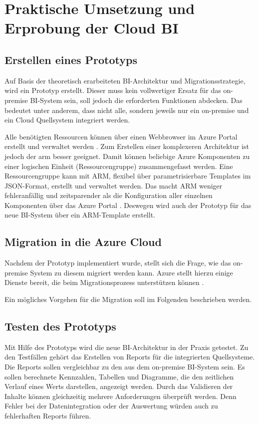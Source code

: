 \chapter{Praktische Umsetzung und Erprobung der Cloud BI} \label{ch:praktischeUmsetzung}

\section{Erstellen eines Prototyps} \label{sec:intro:erstellenDesPrototyps}
Auf Basis der theoretisch erarbeiteten BI-Architektur und Migrationsstrategie, wird ein Prototyp erstellt. Dieser muss kein vollwertiger Ersatz für das on-premise BI-System sein, soll jedoch die erforderten Funktionen abdecken. Das bedeutet unter anderem, dass nicht alle, sondern jeweils nur ein on-premise und ein Cloud Quellsystem integriert werden.

Alle benötigten Ressourcen können über einen Webbrowser im Azure Portal erstellt und verwaltet werden \cite{chilberto_building_2020}. Zum Erstellen einer komplexeren Architektur ist jedoch der \ac{arm} besser geeignet. Damit können beliebige Azure Komponenten zu einer logischen Einheit (Ressourcengruppe) zusammengefasst werden. Eine Ressourcengruppe kann mit ARM, flexibel über parametrisierbare Templates im JSON-Format, erstellt und verwaltet werden. Das macht ARM weniger fehleranfällig und zeitsparender als die Konfiguration aller einzelnen Komponenten über das Azure Portal \cite{monadjemi_azure-administration_2017}. Deswegen wird auch der Prototyp für das neue BI-System über ein ARM-Template erstellt.

\section{Migration in die Azure Cloud} \label{sec:praktischeUmsetzung:Migration}
Nachdem der Prototyp implementiert wurde, stellt sich die Frage, wie das on-premise System zu diesem migriert werden kann. Azure stellt hierzu einige Dienste bereit, die beim Migrationsprozess unterstützen können \cite{chilberto_building_2020}. 

Ein mögliches Vorgehen für die Migration soll im Folgenden beschrieben werden.

\section{Testen des Prototyps} \label{sec:intro:testenDesPrototyps}
Mit Hilfe des Prototyps wird die neue BI-Architektur in der Praxis getestet. Zu den Testfällen gehört das Erstellen von Reports für die integrierten Quellsysteme. Die Reports sollen vergleichbar zu den aus dem on-premise BI-System sein. Es sollen berechnete Kennzahlen, Tabellen und Diagramme, die den zeitlichen Verlauf eines Werts darstellen, angezeigt werden. Durch das Validieren der Inhalte können gleichzeitig mehrere Anforderungen überprüft werden. Denn Fehler bei der Datenintegration oder der Auswertung würden auch zu fehlerhaften Reports führen.